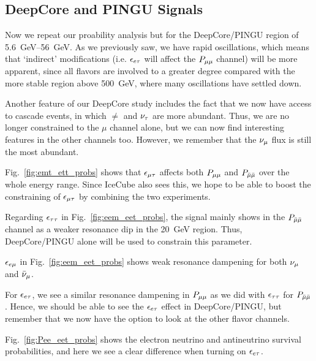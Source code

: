 \subsection{DeepCore and PINGU Signals}
Now we repeat our proability analysis but for the DeepCore/PINGU region of \SIrange{5.6}{56}{\GeV}. As we previously saw,
we have rapid oscillations, which means that `indirect' modifications (i.e. $\epsilon_{e\tau}$ will affect the $P_{\mu\mu}$ channel)
will be more apparent, since all flavors are involved to a greater degree compared with the more stable region above \SI{500}{\GeV}, where 
many oscillations have settled down.

Another feature of our DeepCore study includes the fact that we now have access to cascade events, in which $\ne$ and $\nu_\tau$ are more abundant. %
Thus, we are no longer constrained to the $\mu$ channel alone, but we can now find interesting features in the other channels too. However, we 
remember that the $\nu_\mu$ flux is still the most abundant. %

Fig.~\ref{fig:emt_ett_probs} shows that $\epsilon_{\mu\tau}$ affects both $P_{\mu\mu}$ and $P_{\bar{\mu} \bar{\mu}}$ over the whole energy range. Since 
IceCube also sees this, we hope to be able to boost the constraining of $\epsilon_{\mu\tau}$ by combining the two experiments.

Regarding $\epsilon_{\tau\tau}$ in Fig.~\ref{fig:eem_eet_probs}, the signal mainly shows in the $P_{\bar{\mu} \bar{\mu}}$ channel as
a weaker resonance dip in the \SI{20}{\GeV} region. Thus, DeepCore/PINGU alone will be used to constrain this parameter.

$\epsilon_{e\mu}$ in Fig.~\ref{fig:eem_eet_probs} shows weak resonance dampening for both $\nu_\mu$ and $\bar{\nu}_\mu$. 

For $\epsilon_{e\tau}$, we see a similar resonance dampening in $P_{\mu\mu}$ as we did with $\epsilon_{\tau\tau}$ for $P_{\bar{\mu} \bar{\mu}}$. Hence, we should be able to 
see the $\epsilon_{e\tau}$ effect in DeepCore/PINGU, but remember that we now have the option to look at the other flavor channels.

Fig.~\ref{fig:Pee_eet_probs} shows the electron neutrino and antineutrino survival probabilities, and here we see
a clear difference when turning on $\epsilon_{e\tau}$.

